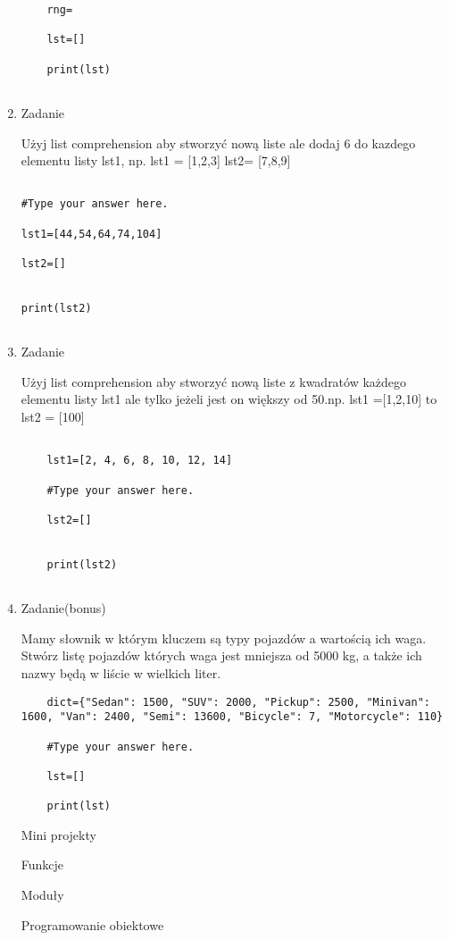 \documentclass[11pt]{article}
\begin{document}
\begin{enumerate}
\begin{lstlisting}
	rng=
	
	lst=[]
	
	print(lst)
	
\end{lstlisting}

\item 
\begin{Large}
	Zadanie
\end{Large}
\par
Użyj list comprehension aby stworzyć nową liste ale dodaj 6 do kazdego elementu listy lst1, np. lst1 = [1,2,3] lst2= [7,8,9] 
\begin{lstlisting}

#Type your answer here.

lst1=[44,54,64,74,104]

lst2=[]


print(lst2)
	
\end{lstlisting}

\item 
\begin{Large}
	Zadanie
\end{Large}
\par
Użyj list comprehension aby stworzyć nową liste z kwadratów każdego elementu listy lst1 ale tylko jeżeli jest on większy od 50.np. lst1 =[1,2,10] to lst2 = [100]
\begin{lstlisting}
	
	lst1=[2, 4, 6, 8, 10, 12, 14]
	
	#Type your answer here.
	
	lst2=[]
	
	
	print(lst2)
	
\end{lstlisting}

\item 
\begin{Large}
	Zadanie(bonus)
\end{Large}
\par
Mamy słownik w którym kluczem są typy pojazdów a wartością ich waga. Stwórz listę pojazdów których waga jest mniejsza od 5000 kg, a także ich nazwy będą w liście w wielkich liter.
\begin{lstlisting}
	dict={"Sedan": 1500, "SUV": 2000, "Pickup": 2500, "Minivan": 1600, "Van": 2400, "Semi": 13600, "Bicycle": 7, "Motorcycle": 110}
	
	#Type your answer here.
	
	lst=[]
	
	print(lst)
\end{lstlisting}

\medskip
\begin{Large}
	Mini projekty
\end{Large}

\medskip
\begin{Large}
	Funkcje
\end{Large}


\medskip
\begin{Large}
	Moduły
\end{Large}

\medskip
\begin{Large}
	Programowanie obiektowe
\end{Large}

\end{enumerate}
	
	
\end{document}
